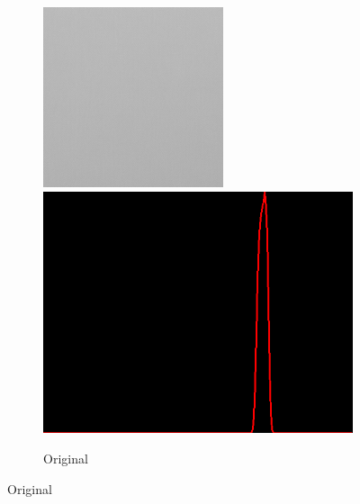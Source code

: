 \begin{figure}[H]
\begin{subfigure}[b]{0.28\textwidth}
        \begin{center}
        	\text{ }
        \end{center}
        \includegraphics[width=\textwidth]{img2/rect_eee_org_res_total.png}\\[0.1cm]
        \includegraphics[width=\textwidth]{img2/hist_rect_eee_org_res_total.png}
        \caption{Original}
        \label{fig:img3_org_final}
    \end{subfigure}

\end{figure}
